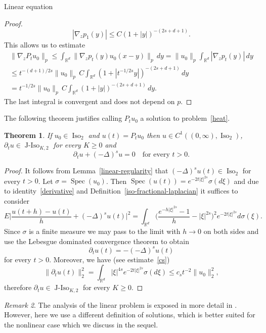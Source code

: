 \documentclass[a4paper,10pt,fleqn]{amsart}
\newtheorem{theorem}{Theorem}[section]
\theoremstyle{remark}
\newtheorem{remark}[theorem]{Remark}
\theoremstyle{definition}
\DeclareMathOperator{\Iso}{Iso}
\DeclareMathOperator{\JIso}{J-Iso}
\DeclareMathOperator{\Spec}{Spec}
\newcommand{\dt} {\partial_t}
\newcommand{\grad} {\nabla_{\!z}}
\newcommand{\X} {{\mathbb{R}^d}}
\renewcommand{\=} {\overset{d}{=}}
\newcommand{\fLap} {(-\Delta)^s}
\begin{document}
\begin{section}{Linear equation}
\begin{proof}
   \begin{equation*}
    |\grad p_1(y)| \leq C(1+|y|)^{-(2s+d+1)}.
   \end{equation*}
   This allows us to estimate
   \begin{multline*}
    \|\grad P_t u_0\|_p
    \leq \int_\X \|\grad p_t(y)u_0(x-y)\|_p\,dy  
    = \|u_0\|_p\int_\X |\grad p_t(y)|\,dy \\
    \leq t^{-(d+1)/2s}\|u_0\|_p \,C\int_\X (1+|t^{-1/2s}y|)^{-(2s+d+1)}\,dy\\
    =t^{-1/2s}\|u_0\|_p \,C\int_\X (1+|y|)^{-(2s+d+1)}\,dy.
   \end{multline*}
   The last integral is convergent and does not depend on $p$.
  \end{proof}
      The following theorem justifies calling $P_tu_0$ a solution to problem~\eqref{heat}.
  \begin{theorem}\label{semigroup-c1}
    If $u_0\in\Iso_2$ and $u(t) =P_tu_0$ then $u\in C^1((0,\infty),\Iso_2)$,
         $\dt u\in\JIso_{K,2}$ for every $K\geq 0$ and
    \begin{equation*}
      \dt u+ \fLap u = 0\quad\text{for every $t>0$}.
    \end{equation*}
  \end{theorem}
  \begin{proof}
    It follows from Lemma~\ref{linear-regularity} that $\fLap u(t)\in\Iso_2$ for every $t>0$.
    Let $\sigma=\Spec(u_0)$. Then $\Spec(u(t)) =  e^{-2t|\xi|^{2s}}\sigma(d\xi)$ and due to identity~\eqref{derivative} and Definition~\ref{iso-fractional-laplacian} it suffices to consider
    \begin{equation*}
      E\Big|\frac{u(t+h)-u(t)}{h}+\fLap u(t)\Big|^2 
      = \int_\X\Big(\frac{e^{-h|\xi|^{2s}}-1}{h}-|\xi|^{2s}\Big)^2 e^{-2t|\xi|^{2s}}d\sigma(\xi).
    \end{equation*}
    Since $\sigma$ is a finite measure we may pass to the limit with $h\to0$ on both sides and use the
    Lebesgue dominated convergence theorem to obtain
    \begin{equation*}
     \dt u(t) = -\fLap u(t)
    \end{equation*}
    for every $t>0$. Moreover, we have (see estimate~\eqref{cs})
    \begin{equation*}
     \|\dt u(t)\|_2^2 = \int_\X|\xi|^{4s}e^{-2t|\xi|^{2s}}\sigma(d\xi)\leq c_s t^{-2}\|u_0\|_2^2,
    \end{equation*}
    therefore $\dt u \in \JIso_{K,2}$ for every $K\geq 0$.
  \end{proof}
  \begin{remark}
    The analysis of the linear problem is exposed in more detail in \cite{MR3628179}.
    However, here we use a different definition of solutions, which is better suited for the nonlinear case which we
    discuss in the sequel.
  \end{remark}
    \end{section}
\end{document}
